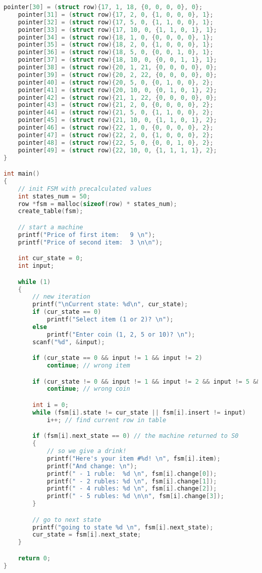\begin{lstlisting}[language=c, caption={Фрагмент функции main}]
    pointer[30] = (struct row){17, 1, 18, {0, 0, 0, 0}, 0};
    pointer[31] = (struct row){17, 2, 0, {1, 0, 0, 0}, 1};
    pointer[32] = (struct row){17, 5, 0, {1, 1, 0, 0}, 1};
    pointer[33] = (struct row){17, 10, 0, {1, 1, 0, 1}, 1};
    pointer[34] = (struct row){18, 1, 0, {0, 0, 0, 0}, 1};
    pointer[35] = (struct row){18, 2, 0, {1, 0, 0, 0}, 1};
    pointer[36] = (struct row){18, 5, 0, {0, 0, 1, 0}, 1};
    pointer[37] = (struct row){18, 10, 0, {0, 0, 1, 1}, 1};
    pointer[38] = (struct row){20, 1, 21, {0, 0, 0, 0}, 0};
    pointer[39] = (struct row){20, 2, 22, {0, 0, 0, 0}, 0};
    pointer[40] = (struct row){20, 5, 0, {0, 1, 0, 0}, 2};
    pointer[41] = (struct row){20, 10, 0, {0, 1, 0, 1}, 2};
    pointer[42] = (struct row){21, 1, 22, {0, 0, 0, 0}, 0};
    pointer[43] = (struct row){21, 2, 0, {0, 0, 0, 0}, 2};
    pointer[44] = (struct row){21, 5, 0, {1, 1, 0, 0}, 2};
    pointer[45] = (struct row){21, 10, 0, {1, 1, 0, 1}, 2};
    pointer[46] = (struct row){22, 1, 0, {0, 0, 0, 0}, 2};
    pointer[47] = (struct row){22, 2, 0, {1, 0, 0, 0}, 2};
    pointer[48] = (struct row){22, 5, 0, {0, 0, 1, 0}, 2};
    pointer[49] = (struct row){22, 10, 0, {1, 1, 1, 1}, 2};
}

int main()
{
    // init FSM with precalculated values
    int states_num = 50;
    row *fsm = malloc(sizeof(row) * states_num);
    create_table(fsm);

    // start a machine
    printf("Price of first item:   9 \n");
    printf("Price of second item:  3 \n\n");

    int cur_state = 0;
    int input;

    while (1)
    {
        // new iteration
        printf("\nCurrent state: %d\n", cur_state);
        if (cur_state == 0)
            printf("Select item (1 or 2)? \n");
        else
            printf("Enter coin (1, 2, 5 or 10)? \n");
        scanf("%d", &input);

        if (cur_state == 0 && input != 1 && input != 2)
            continue; // wrong item

        if (cur_state != 0 && input != 1 && input != 2 && input != 5 && input != 10)
            continue; // wrong coin

        int i = 0;
        while (fsm[i].state != cur_state || fsm[i].insert != input)
            i++; // find current row in table

        if (fsm[i].next_state == 0) // the machine returned to S0
        {
            // so we give a drink!
            printf("Here's your item #%d! \n", fsm[i].item);
            printf("And change: \n");
            printf(" - 1 ruble:  %d \n", fsm[i].change[0]);
            printf(" - 2 rubles: %d \n", fsm[i].change[1]);
            printf(" - 4 rubles: %d \n", fsm[i].change[2]);
            printf(" - 5 rubles: %d \n\n", fsm[i].change[3]);
        }

        // go to next state
        printf("going to state %d \n", fsm[i].next_state);
        cur_state = fsm[i].next_state;
    }

    return 0;
}
    
\end{lstlisting}

